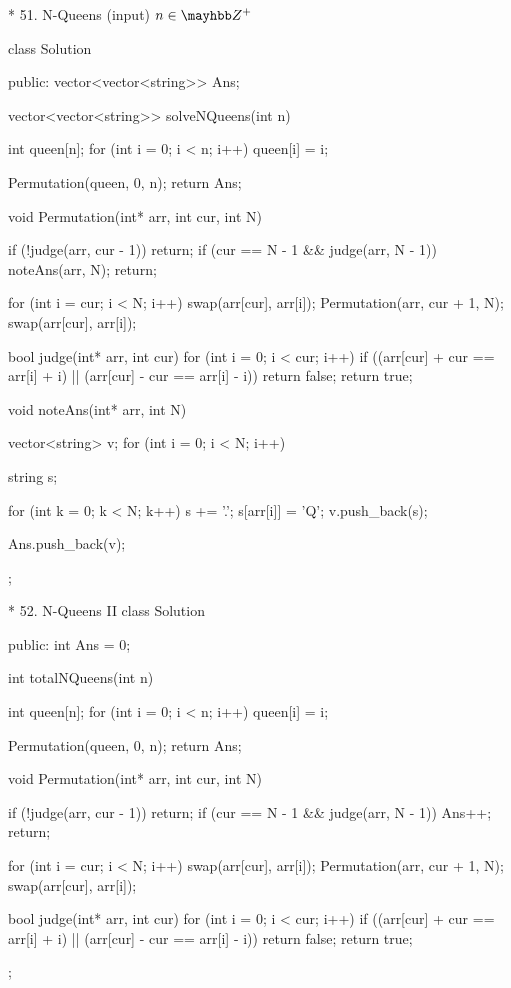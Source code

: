 * 51. N-Queens
	\Problem
		(input) $n \in \mayhbb Z^+$
		
		class Solution {
		public:
			vector<vector<string>> Ans;

			vector<vector<string>> solveNQueens(int n) {

				int queen[n];
				for (int i = 0; i < n; i++) 
					queen[i] = i;

				Permutation(queen, 0, n);
				return Ans;
			}

			void Permutation(int* arr, int cur, int N) {
				if (!judge(arr, cur - 1)) 
					return;
				if (cur == N - 1 && judge(arr, N - 1)) {
					noteAns(arr, N);
					return; 
				}

				for (int i = cur; i < N; i++) {
					swap(arr[cur], arr[i]);
					Permutation(arr, cur + 1, N);
					swap(arr[cur], arr[i]);
				}
			}

			bool judge(int* arr, int cur) {
				for (int i = 0; i < cur; i++)
					if ((arr[cur] + cur == arr[i] + i) ||
						(arr[cur] - cur == arr[i] - i)) 
						return false;
				return true;
			}

			void noteAns(int* arr, int N) {
				vector<string> v;
				for (int i = 0; i < N; i++) {
					string s;

					for (int k = 0; k < N; k++)
						s += '.';
					s[arr[i]] = 'Q';
					v.push_back(s);
				}
				Ans.push_back(v);
			}

		};

* 52. N-Queens II
		class Solution {
		public:
			int Ans = 0;
		
			int totalNQueens(int n) {
		
				int queen[n];
				for (int i = 0; i < n; i++)
					queen[i] = i;
		
				Permutation(queen, 0, n);
				return Ans;
			}
		
			void Permutation(int* arr, int cur, int N)
			{
				if (!judge(arr, cur - 1))
					return;
				if (cur == N - 1 && judge(arr, N - 1)) {
					Ans++;
					return;
				}
		
				for (int i = cur; i < N; i++) {
					swap(arr[cur], arr[i]);
					Permutation(arr, cur + 1, N);
					swap(arr[cur], arr[i]);
				}
			}
		
			bool judge(int* arr, int cur) {
				for (int i = 0; i < cur; i++)
					if ((arr[cur] + cur == arr[i] + i) ||
						(arr[cur] - cur == arr[i] - i))
						return false;
				return true;
			}
		
		};

